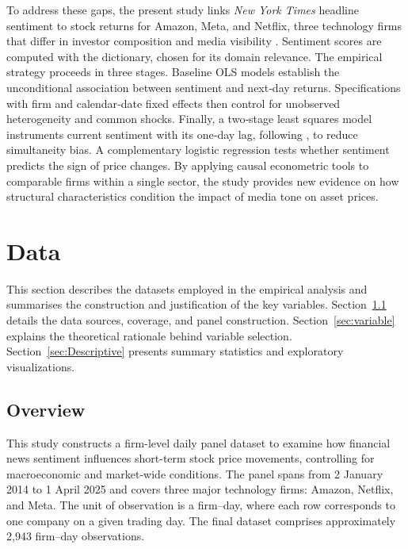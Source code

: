 \documentclass[12pt]{article}
\begin{document}
To address these gaps, the present study links \textit{New York Times} headline sentiment to stock returns for Amazon, Meta, and Netflix, three technology firms that differ in investor composition and media visibility \citep{cristescu2023wavelet}.  Sentiment scores are computed with the \citet{loughran2011} dictionary, chosen for its domain relevance.  The empirical strategy proceeds in three stages.  Baseline OLS models establish the unconditional association between sentiment and next‑day returns.  Specifications with firm and calendar‑date fixed effects then control for unobserved heterogeneity and common shocks.  Finally, a two‑stage least squares model instruments current sentiment with its one‑day lag, following \citet{tetlock2007giving}, to reduce simultaneity bias.  A complementary logistic regression tests whether sentiment predicts the sign of price changes.  By applying causal econometric tools to comparable firms within a single sector, the study provides new evidence on how structural characteristics condition the impact of media tone on asset prices.

\section{Data}
\label{sec:Data}
This section describes the datasets employed in the empirical analysis and summarises the construction and justification of the key variables. Section~\ref{sec:Overview} details the data sources, coverage, and panel construction. Section~\ref{sec:variable} explains the theoretical rationale behind variable selection. Section~\ref{sec:Descriptive} presents summary statistics and exploratory visualizations.

\subsection{Overview}
\label{sec:Overview}
This study constructs a firm-level daily panel dataset to examine how financial news sentiment influences short-term stock price movements, controlling for macroeconomic and market-wide conditions. The panel spans from 2 January 2014 to 1 April 2025 and covers three major technology firms: Amazon, Netflix, and Meta. The unit of observation is a firm--day, where each row corresponds to one company on a given trading day. The final dataset comprises approximately 2{,}943 firm--day observations.
\end{document}
